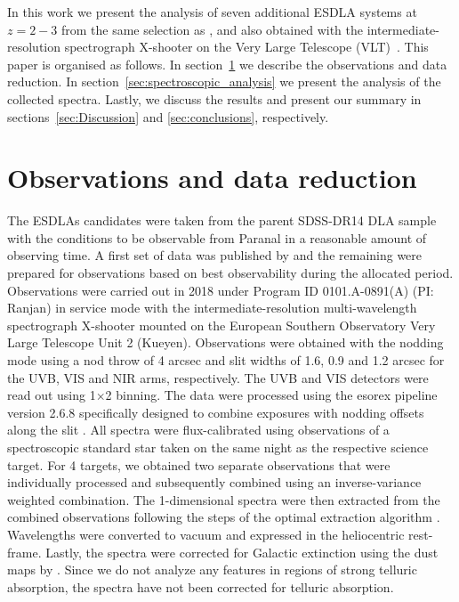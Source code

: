 \documentclass[fleqn,usenatbib,useAMS]{mnras}
\begin{document}
In this work we present the analysis of seven additional ESDLA systems at $z=2-3$ from the same selection as \citet{Ranjan2020}, and also obtained with the intermediate-resolution spectrograph X-shooter on the Very Large Telescope (VLT)~\citep{Vernet2011}. This paper is organised as follows. In section~\ref{sec:Data} we describe the observations and data reduction. In section~\ref{sec:spectroscopic_analysis} we present the analysis of the collected spectra. 
Lastly, we discuss the results and present our summary in sections~\ref{sec:Discussion} and \ref{sec:conclusions}, respectively.


\section{Observations and data reduction}\label{sec:Data}

The ESDLAs candidates were taken from the parent SDSS-DR14 DLA sample with the conditions to be observable from Paranal in a reasonable amount of observing time. A first set of data was published by \citet{Ranjan2020} and the remaining were prepared for observations based on best observability during the allocated period.
Observations were carried out in 2018 under Program ID 0101.A-0891(A) (PI: Ranjan) in service mode with the intermediate-resolution multi-wavelength spectrograph X-shooter mounted on the European Southern Observatory Very Large Telescope Unit 2 (Kueyen). Observations were obtained with the nodding mode using a nod throw of 4 arcsec and slit widths of 1.6, 0.9 and 1.2 arcsec for the UVB, VIS and NIR arms, respectively. The UVB and VIS detectors were read out using 1$\times$2 binning. 
The data were processed using the esorex pipeline version 2.6.8 specifically designed to combine exposures with nodding offsets along the slit \citep{Goldoni2006, Modigliani2010}. All spectra were flux-calibrated using observations of a spectroscopic standard star taken on the same night as the respective science target. For 4 targets, we obtained two separate observations that were individually processed and subsequently combined using an inverse-variance weighted combination. The 1-dimensional spectra were then extracted from the combined observations following the steps of the optimal extraction algorithm \citep{Horne1986}. Wavelengths were converted to vacuum and expressed in the heliocentric rest-frame. Lastly, the spectra were corrected for Galactic extinction using the dust maps by \citet{Schlafly2011ApJ}. Since we do not analyze any features in regions of strong telluric absorption, the spectra have not been corrected for telluric absorption.
\end{document}
